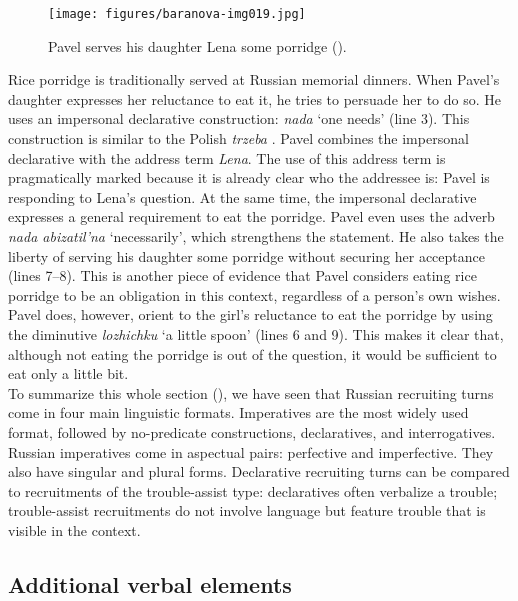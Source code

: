 \documentclass[output=paper,modfonts,nonflat]{langsci/langscibook}
\begin{document}
\begin{figure}
\texttt{[image: figures/baranova-img019.jpg]}
\caption{Pavel serves his daughter Lena some porridge ().}
\label{fig:baranova:19}
\end{figure}

\hspace*{-.5mm}Rice porridge is traditionally served at Russian memorial dinners. When Pavel’s daughter expresses her reluctance to eat it, he tries to persuade her to do so. He uses an impersonal declarative construction: \textit{nada} ‘one needs’ (line 3). This construction is similar to the Polish \textit{trzeba} \citep{ZinkenOgiermann2011}. Pavel combines the impersonal declarative with the address term \textit{Lena}. The use of this address term is pragmatically marked because it is already clear who the addressee is: Pavel is responding to Lena’s question. At the same time, the impersonal declarative expresses a general requirement to eat the porridge. Pavel even uses the adverb \textit{nada abizatil'na} ‘necessarily’, which strengthens the statement. He also takes the liberty of serving his daughter some porridge without securing her acceptance (lines 7--8). This is another piece of evidence that Pavel considers eating rice porridge to be an obligation in this context, regardless of a person’s own wishes. Pavel does, however, orient to the girl's reluctance to eat the porridge by using the diminutive \textit{lozhichku} ‘a little spoon’ (lines 6 and 9). This makes it clear that, although not eating the porridge is out of the question, it would be sufficient to eat only a little bit.\\

\noindent
To summarize this whole section (), we have seen that Russian recruiting turns come in four main linguistic formats. Imperatives are the most widely used format, followed by no-predicate constructions, declaratives, and interrogatives. Russian imperatives come in aspectual pairs: perfective and imperfective. They also have singular and plural forms. Declarative recruiting turns can be compared to recruitments of the trouble-assist type: declaratives often verbalize a trouble; trouble-assist recruitments do not involve language but feature trouble that is visible in the context.

\subsection{Additional verbal elements}\label{sec:baranova:3.4}
\end{document}
